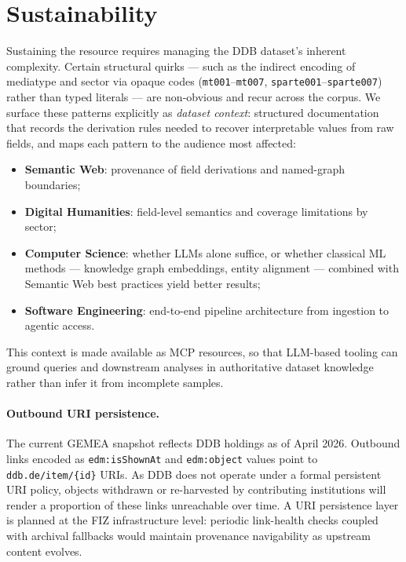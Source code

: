 
\section{Sustainability}
\label{sec:sustainability}

Sustaining the resource requires managing the DDB dataset's inherent complexity.
Certain structural quirks --- such as the indirect encoding of mediatype and sector via opaque codes (\texttt{mt001}--\texttt{mt007}, \texttt{sparte001}--\texttt{sparte007}) rather than typed literals --- are non-obvious and recur across the corpus.
We surface these patterns explicitly as \emph{dataset context}: structured documentation that records the derivation rules needed to recover interpretable values from raw fields, and maps each pattern to the audience most affected:
\begin{itemize}
  \item \textbf{Semantic Web}: provenance of field derivations and named-graph boundaries;
  \item \textbf{Digital Humanities}: field-level semantics and coverage limitations by sector;
  \item \textbf{Computer Science}: whether LLMs alone suffice, or whether classical ML methods --- knowledge graph embeddings, entity alignment --- combined with Semantic Web best practices yield better results;
  \item \textbf{Software Engineering}: end-to-end pipeline architecture from ingestion to agentic access.
\end{itemize}
This context is made available as MCP resources, so that LLM-based tooling can ground queries and downstream analyses in authoritative dataset knowledge rather than infer it from incomplete samples.

\paragraph{Outbound URI persistence.}
The current GEMEA snapshot reflects DDB holdings as of April 2026.
Outbound links encoded as \texttt{edm:isShownAt} and \texttt{edm:object} values point to \texttt{ddb.de/item/\{id\}} URIs.
As DDB does not operate under a formal persistent URI policy, objects withdrawn or re-harvested by contributing institutions will render a proportion of these links unreachable over time.
A URI persistence layer is planned at the FIZ infrastructure level: periodic link-health checks coupled with archival fallbacks would maintain provenance navigability as upstream content evolves.
